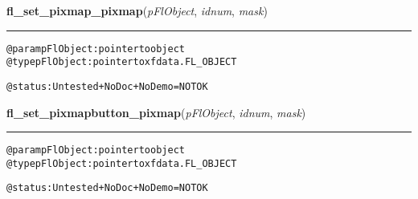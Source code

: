 \hspace{.8\funcindent}\begin{boxedminipage}{\funcwidth}

    \raggedright \textbf{fl\_set\_pixmap\_pixmap}(\textit{pFlObject}, \textit{idnum}, \textit{mask})

    \vspace{-1.5ex}

    \rule{\textwidth}{0.5\fboxrule}
\setlength{\parskip}{2ex}
\begin{alltt}
        @param pFlObject: pointer to object
@type pFlObject: pointer to xfdata.FL\_OBJECT

        @status: Untested + NoDoc + NoDemo = NOT OK
    
\end{alltt}

\setlength{\parskip}{1ex}
    \end{boxedminipage}

    \label{xformslib:flbitmap:fl_set_pixmap_pixmap}

    \vspace{0.5ex}

\hspace{.8\funcindent}\begin{boxedminipage}{\funcwidth}

    \raggedright \textbf{fl\_set\_pixmapbutton\_pixmap}(\textit{pFlObject}, \textit{idnum}, \textit{mask})

    \vspace{-1.5ex}

    \rule{\textwidth}{0.5\fboxrule}
\setlength{\parskip}{2ex}
\begin{alltt}
        @param pFlObject: pointer to object
@type pFlObject: pointer to xfdata.FL\_OBJECT

        @status: Untested + NoDoc + NoDemo = NOT OK
    
\end{alltt}

\setlength{\parskip}{1ex}
    \end{boxedminipage}

    \label{xformslib:flbitmap:fl_set_pixmap_colorcloseness}

    \vspace{0.5ex}

